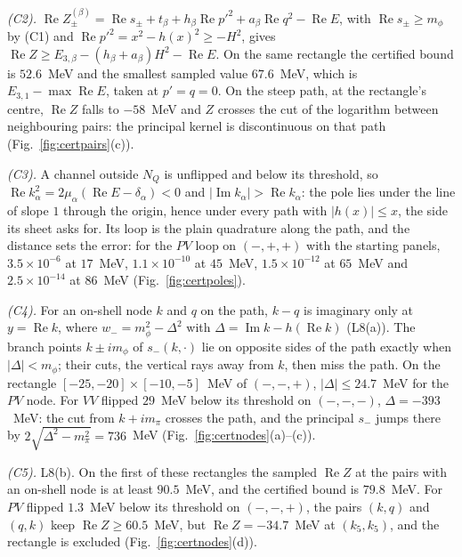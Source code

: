 \documentclass[11pt]{article}
\begin{document}
\emph{(C2).} $\operatorname{Re}Z^{(\beta)}_\pm=\operatorname{Re}s_\pm+t_\beta+h_\beta\operatorname{Re}p'^2+a_\beta\operatorname{Re}q^2-\operatorname{Re}E$, with $\operatorname{Re}s_\pm\ge m_\phi$ by (C1) and $\operatorname{Re}p'^2=x^2-h(x)^2\ge-H^2$, gives $\operatorname{Re}Z\ge E_{3,\beta}-(h_\beta+a_\beta)H^2-\operatorname{Re}E$. On the same rectangle the certified bound is $52.6$~MeV and the smallest sampled value $67.6$~MeV, which is $E_{3,1}-\max\operatorname{Re}E$, taken at $p'=q=0$. On the steep path, at the rectangle's centre, $\operatorname{Re}Z$ falls to $-58$~MeV and $Z$ crosses the cut of the logarithm between neighbouring pairs: the principal kernel is discontinuous on that path (Fig.~\ref{fig:certpairs}(c)).

\emph{(C3).} A channel outside $N_Q$ is unflipped and below its threshold, so $\operatorname{Re}k_\alpha^2=2\mu_\alpha(\operatorname{Re}E-\delta_\alpha)<0$ and $|\operatorname{Im}k_\alpha|>\operatorname{Re}k_\alpha$: the pole lies under the line of slope $1$ through the origin, hence under every path with $|h(x)|\le x$, the side its sheet asks for. Its loop is the plain quadrature along the path, and the distance sets the error: for the $PV$ loop on $(-,+,+)$ with the starting panels, $3.5\times10^{-6}$ at $17$~MeV, $1.1\times10^{-10}$ at $45$~MeV, $1.5\times10^{-12}$ at $65$~MeV and $2.5\times10^{-14}$ at $86$~MeV (Fig.~\ref{fig:certpoles}).

\emph{(C4).} For an on-shell node $k$ and $q$ on the path, $k-q$ is imaginary only at $y=\operatorname{Re}k$, where $w_-=m_\phi^2-\Delta^2$ with $\Delta=\operatorname{Im}k-h(\operatorname{Re}k)$ (L8(a)). The branch points $k\pm im_\phi$ of $s_-(k,\cdot)$ lie on opposite sides of the path exactly when $|\Delta|<m_\phi$; their cuts, the vertical rays away from $k$, then miss the path. On the rectangle $[-25,-20]\times[-10,-5]$~MeV of $(-,-,+)$, $|\Delta|\le24.7$~MeV for the $PV$ node. For $VV$ flipped $29$~MeV below its threshold on $(-,-,-)$, $\Delta=-393$~MeV: the cut from $k+im_\pi$ crosses the path, and the principal $s_-$ jumps there by $2\sqrt{\Delta^2-m_\pi^2}=736$~MeV (Fig.~\ref{fig:certnodes}(a)--(c)).

\emph{(C5).} L8(b). On the first of these rectangles the sampled $\operatorname{Re}Z$ at the pairs with an on-shell node is at least $90.5$~MeV, and the certified bound is $79.8$~MeV. For $PV$ flipped $1.3$~MeV below its threshold on $(-,-,+)$, the pairs $(k,q)$ and $(q,k)$ keep $\operatorname{Re}Z\ge60.5$~MeV, but $\operatorname{Re}Z=-34.7$~MeV at $(k_5,k_5)$, and the rectangle is excluded (Fig.~\ref{fig:certnodes}(d)).
\end{document}
